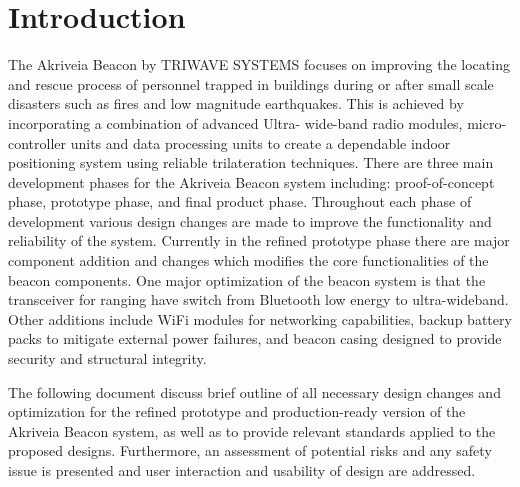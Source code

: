 

\setcounter{section}{0}
\section{Introduction}

\bigskip
The Akriveia Beacon by TRIWAVE SYSTEMS focuses on improving the locating and rescue
process of personnel trapped in buildings during or after small scale disasters such as fires and
low magnitude earthquakes. This is achieved by incorporating a combination of advanced Ultra-
wide-band radio modules, micro-controller units and data processing units to create a dependable
indoor positioning system using reliable trilateration techniques. There are three main development phases for the Akriveia Beacon system including: proof-of-concept phase, prototype phase, and final product phase. Throughout each phase of development various design changes are made to improve the functionality and reliability of the system. Currently in the refined prototype phase there are major component addition and changes which modifies the core functionalities of the beacon components. One major optimization of the beacon system is that the transceiver for ranging have switch from  Bluetooth low energy to ultra-wideband. Other additions include WiFi modules for networking capabilities, backup battery packs to mitigate external power failures, and beacon casing designed to provide security and structural integrity. 

\bigskip
The following document discuss brief outline of all necessary design changes and optimization for the refined prototype and production-ready version of the Akriveia Beacon system, as well as to provide relevant standards applied to the proposed designs. Furthermore, an assessment of potential risks and any safety issue is presented and user interaction and usability of design are addressed.

